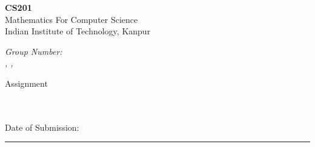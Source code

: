 \newcommand{\courseNumb}{CS201}
\newcommand{\courseName}{Mathematics For Computer Science}
\newcommand{\subDate}{}
\newcommand{\assignNumb}{2}

\begin{minipage}[t]{0.50\linewidth}
    \begin{flushleft}
        {\huge \textbf{\courseNumb}}\\
        {\large \courseName}\\
        {\normalsize Indian Institute of Technology, Kanpur}\\
        \rule{0mm}{8mm}%
        {\large \itshape Group Number: \GroupNum}\\
        {\normalsize \textit{\MembAName, \MembBName, \MembCName}}
    \end{flushleft}

\end{minipage}
\hfill
\begin{minipage}[t]{0.40\linewidth}
    \centering
    {\huge Assignment}\\ \rule{0mm}{15mm} \scalebox{5}{\assignNumb}\\~\\
        Date of Submission: \subDate

\end{minipage}

\rule{0mm}{0.5mm}%

{\centering \rule{0.99\linewidth}{1pt} }